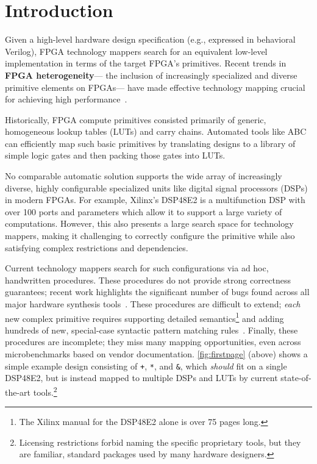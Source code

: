 \section{Introduction}
\label{sec:intro}



Given a high-level hardware design specification
  (e.g., expressed in behavioral Verilog),
  FPGA technology mappers
  search for an equivalent
  low-level implementation
  in terms of the target FPGA's
  primitives.
Recent trends in \textbf{FPGA heterogeneity}---%
  the inclusion of increasingly specialized and diverse primitive elements on FPGAs---%
  have made effective
  technology mapping
  crucial for achieving
  high performance~\cite{vega2021reticle}.

Historically,
  FPGA compute primitives
  consisted primarily of
  generic, homogeneous 
  lookup tables (LUTs) and carry chains.
Automated tools like 
  ABC~\cite{ABC,abc2,brayton2010abc}
  can efficiently map such basic primitives
  by translating  designs
  to a library of simple logic gates
  and then packing those gates
  into LUTs.

No comparable
  automatic solution supports
  the wide array of increasingly diverse, highly configurable
  specialized units like digital signal processors (DSPs)
  in modern FPGAs.
For example, Xilinx's DSP48E2
  is a multifunction DSP with over
  100 ports and parameters which
  allow it to
  support a large variety of computations.
  However, this also presents a large search space
  for technology mappers,
  making it challenging
  to correctly configure the primitive
  while also satisfying complex restrictions and dependencies.

Current technology mappers search for such
  configurations via ad hoc, handwritten procedures.
These procedures do not provide strong correctness guarantees;
  recent work highlights the significant number of bugs found across 
  all major hardware synthesis tools~\cite{herklotz2020finding}.
These procedures are difficult to extend;
  \textit{each} new complex primitive requires
  supporting detailed semantics\footnote{
      The Xilinx manual for the DSP48E2 alone
      is over 75 pages long.}
  and adding hundreds of new, special-case
  syntactic pattern matching rules~\cite{wolf2013yosys}.
Finally, these procedures are incomplete;
  they miss many mapping opportunities,
  even across microbenchmarks based on vendor documentation.
\cref{fig:firstpage} (above) shows a
  simple example design consisting of
  \verb-+-, \verb-*-, and \verb-&-,
  which \textit{should} fit on a single DSP48E2,
  but is instead mapped to multiple DSPs and LUTs
  by current state-of-the-art tools.\footnote{
    Licensing restrictions forbid naming the
    specific proprietary tools, but they are familiar,
    standard packages used by many hardware designers.
  }\tighten
  
